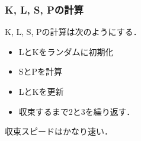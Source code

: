 \subsubsection{K, L, S, Pの計算}
K, L, S, Pの計算は次のようにする．
\begin{itemize}
\item LとKをランダムに初期化
\item SとPを計算
\item LとKを更新
\item 収束するまで2と3を繰り返す．
\end{itemize}

収束スピードはかなり速い．
